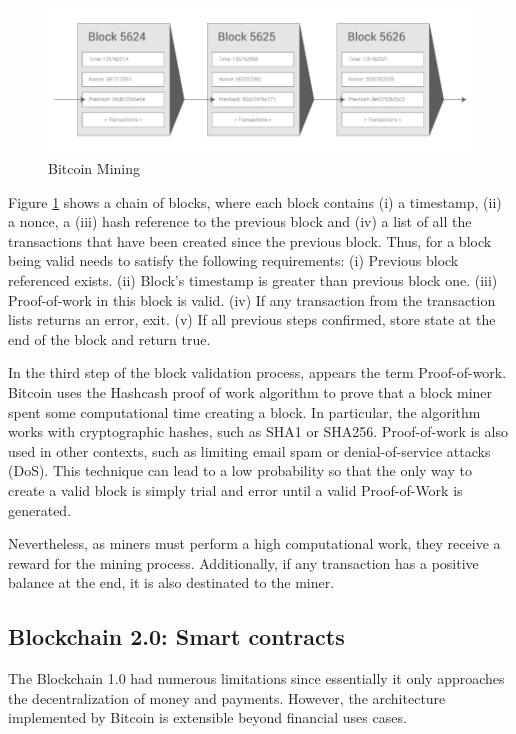 \begin{figure}
  \centering
  	\includegraphics[scale=0.5]{gfx/mining.png}
  \caption{Bitcoin Mining}
  \label{fig:Bitcoin mining}
\end{figure}

Figure \ref{fig:Bitcoin mining} shows a chain of blocks, where each block contains (i) a timestamp, (ii) a nonce, a (iii) hash reference to the previous block and (iv) a list of all the transactions that have been created since the previous block. Thus, for a block being valid needs to satisfy the following requirements: \newline (i) Previous block referenced exists. (ii) Block's timestamp is greater than previous block one. (iii) Proof-of-work in this block is valid. (iv) If any transaction from the transaction lists returns an error, exit. (v) If all previous steps confirmed, store state at the end of the block and return true.

In the third step of the block validation process, appears the term Proof-of-work. Bitcoin uses the Hashcash proof of work algorithm to prove that a block miner spent some computational time creating a block. In particular, the algorithm works with cryptographic hashes, such as SHA1 or SHA256. Proof-of-work is also used in other contexts, such as limiting email spam or denial-of-service attacks (DoS). This technique can lead to a low probability so that the only way to create a valid block is simply trial and error until a valid Proof-of-Work is generated.

Nevertheless, as miners must perform a high computational work, they receive a reward for the mining process. Additionally, if any transaction has a positive balance at the end, it is also destinated to the miner.


\subsection{Blockchain 2.0: Smart contracts}

The Blockchain 1.0 had numerous limitations since essentially it only approaches the decentralization of money and payments. However, the architecture implemented by Bitcoin is extensible beyond financial uses cases.

